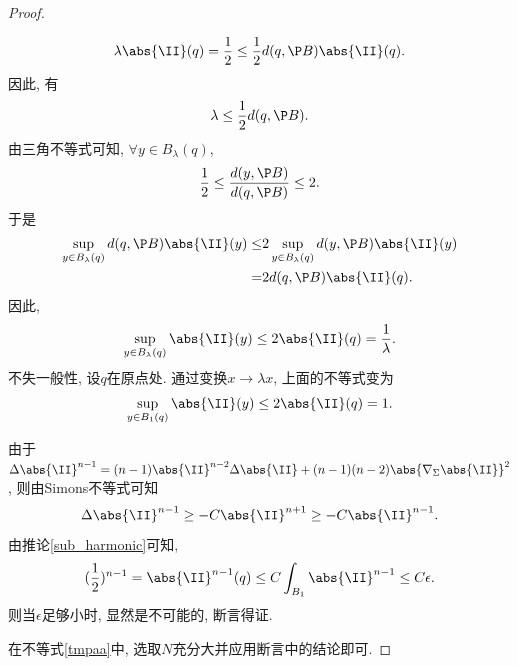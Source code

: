 \begin{proof}
\begin{claim}
\begin{subproof}
            \begin{equation}
                \lambda\abs{\II}(q)=\frac{1}{2} \le \frac{1}{2} d(q,\P B)\abs{\II}(q).
            \end{equation}
            因此, 有
            \begin{equation}
                \lambda \le \frac{1}{2}d(q,\P B).
            \end{equation}
            由三角不等式可知,  $\forall y \in B_\lambda(q)$,
            \begin{equation}
                \frac{1}{2} \le \frac{d(y,\P B)}{d(q,\P B)} \le 2.
            \end{equation}
            于是
            \begin{equation}
                \begin{split}
                    \sup_{y\in B_\lambda(q)} d(q,\P B) \abs{\II}(y) \le &2\sup_{y\in B_\lambda(q)}d(y,\P B)\abs{\II}(y) \\
                    =& 2d(q,\P B) \abs{\II}(q).
                \end{split}
            \end{equation}
            因此,
            \begin{equation}
                \sup_{y \in B_\lambda(q)} \abs{\II}(y) \le 2\abs{\II}(q)=\frac{1}{\lambda}.
            \end{equation}
            不失一般性, 设$q$在原点处.  通过变换$x\to \lambda x$, 上面的不等式变为
            \begin{equation} \label{iii_sup}
                \sup_{y \in B_1(q)} \abs{\II}(y) \le 2\abs{\II}(q)=1.
            \end{equation}

            由于$\Delta \abs{\II}^{n-1}=(n-1)\abs{\II}^{n-2}\Delta \abs{\II}+(n-1)(n-2)\abs{\nabla_\Sigma \abs{\II}}^2$, 则由Simons不等式可知
            \begin{equation}
                 \Delta \abs{\II}^{n-1} \ge -C\abs{\II}^{n+1} \ge -C\abs{\II}^{n-1}.
            \end{equation}
            由推论\eqref{sub_harmonic}可知,
            \begin{equation}
                (\frac{1}{2})^{n-1}=\abs{\II}^{n-1}(q) \le C \int_{B_1} \abs{\II}^{n-1} \le C\epsilon.
            \end{equation}
            则当$\epsilon$足够小时, 显然是不可能的, 断言得证.
       \end{subproof}
   \end{claim}
   在不等式\eqref{tmpaa}中, 选取$N$充分大并应用断言中的结论即可.
\end{proof}
